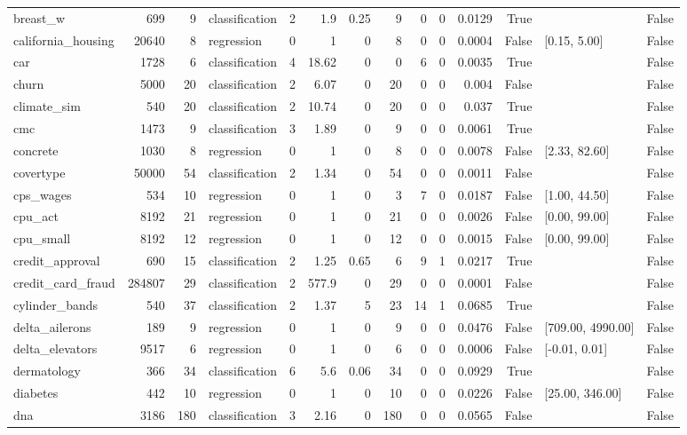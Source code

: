 \begin{table}
\begin{tabular}{lrrlrrrrrrrrlr}
breast\_w & 699 & 9 & classification & 2 & 1.9 & 0.25 & 9 & 0 & 0 & 0.0129 & True &  & False \\
california\_housing & 20640 & 8 & regression & 0 & 1 & 0 & 8 & 0 & 0 & 0.0004 & False & [0.15, 5.00] & False \\
car & 1728 & 6 & classification & 4 & 18.62 & 0 & 0 & 6 & 0 & 0.0035 & True &  & False \\
churn & 5000 & 20 & classification & 2 & 6.07 & 0 & 20 & 0 & 0 & 0.004 & False &  & False \\
climate\_sim & 540 & 20 & classification & 2 & 10.74 & 0 & 20 & 0 & 0 & 0.037 & True &  & False \\
cmc & 1473 & 9 & classification & 3 & 1.89 & 0 & 9 & 0 & 0 & 0.0061 & True &  & False \\
concrete & 1030 & 8 & regression & 0 & 1 & 0 & 8 & 0 & 0 & 0.0078 & False & [2.33, 82.60] & False \\
covertype & 50000 & 54 & classification & 2 & 1.34 & 0 & 54 & 0 & 0 & 0.0011 & False &  & False \\
cps\_wages & 534 & 10 & regression & 0 & 1 & 0 & 3 & 7 & 0 & 0.0187 & False & [1.00, 44.50] & False \\
cpu\_act & 8192 & 21 & regression & 0 & 1 & 0 & 21 & 0 & 0 & 0.0026 & False & [0.00, 99.00] & False \\
cpu\_small & 8192 & 12 & regression & 0 & 1 & 0 & 12 & 0 & 0 & 0.0015 & False & [0.00, 99.00] & False \\
credit\_approval & 690 & 15 & classification & 2 & 1.25 & 0.65 & 6 & 9 & 1 & 0.0217 & True &  & False \\
credit\_card\_fraud & 284807 & 29 & classification & 2 & 577.9 & 0 & 29 & 0 & 0 & 0.0001 & False &  & False \\
cylinder\_bands & 540 & 37 & classification & 2 & 1.37 & 5 & 23 & 14 & 1 & 0.0685 & True &  & False \\
delta\_ailerons & 189 & 9 & regression & 0 & 1 & 0 & 9 & 0 & 0 & 0.0476 & False & [709.00, 4990.00] & False \\
delta\_elevators & 9517 & 6 & regression & 0 & 1 & 0 & 6 & 0 & 0 & 0.0006 & False & [-0.01, 0.01] & False \\
dermatology & 366 & 34 & classification & 6 & 5.6 & 0.06 & 34 & 0 & 0 & 0.0929 & True &  & False \\
diabetes & 442 & 10 & regression & 0 & 1 & 0 & 10 & 0 & 0 & 0.0226 & False & [25.00, 346.00] & False \\
dna & 3186 & 180 & classification & 3 & 2.16 & 0 & 180 & 0 & 0 & 0.0565 & False &  & False \\

\end{tabular}
\end{table}
